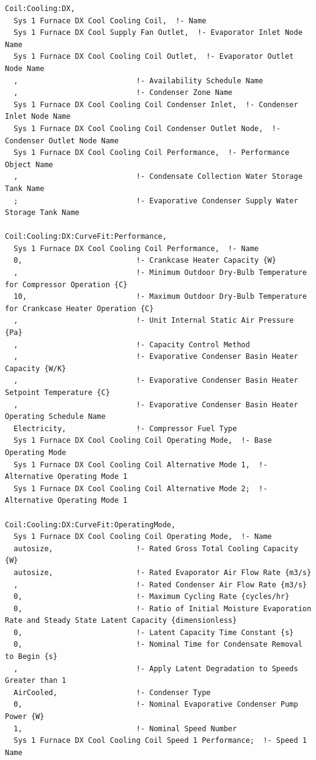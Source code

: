 \begin{lstlisting}
Coil:Cooling:DX,
  Sys 1 Furnace DX Cool Cooling Coil,  !- Name
  Sys 1 Furnace DX Cool Supply Fan Outlet,  !- Evaporator Inlet Node Name
  Sys 1 Furnace DX Cool Cooling Coil Outlet,  !- Evaporator Outlet Node Name
  ,                           !- Availability Schedule Name
  ,                           !- Condenser Zone Name
  Sys 1 Furnace DX Cool Cooling Coil Condenser Inlet,  !- Condenser Inlet Node Name
  Sys 1 Furnace DX Cool Cooling Coil Condenser Outlet Node,  !- Condenser Outlet Node Name
  Sys 1 Furnace DX Cool Cooling Coil Performance,  !- Performance Object Name
  ,                           !- Condensate Collection Water Storage Tank Name
  ;                           !- Evaporative Condenser Supply Water Storage Tank Name

Coil:Cooling:DX:CurveFit:Performance,
  Sys 1 Furnace DX Cool Cooling Coil Performance,  !- Name
  0,                          !- Crankcase Heater Capacity {W}
  ,                           !- Minimum Outdoor Dry-Bulb Temperature for Compressor Operation {C}
  10,                         !- Maximum Outdoor Dry-Bulb Temperature for Crankcase Heater Operation {C}
  ,                           !- Unit Internal Static Air Pressure {Pa}
  ,                           !- Capacity Control Method
  ,                           !- Evaporative Condenser Basin Heater Capacity {W/K}
  ,                           !- Evaporative Condenser Basin Heater Setpoint Temperature {C}
  ,                           !- Evaporative Condenser Basin Heater Operating Schedule Name
  Electricity,                !- Compressor Fuel Type
  Sys 1 Furnace DX Cool Cooling Coil Operating Mode,  !- Base Operating Mode
  Sys 1 Furnace DX Cool Cooling Coil Alternative Mode 1,  !- Alternative Operating Mode 1
  Sys 1 Furnace DX Cool Cooling Coil Alternative Mode 2;  !- Alternative Operating Mode 1

Coil:Cooling:DX:CurveFit:OperatingMode,
  Sys 1 Furnace DX Cool Cooling Coil Operating Mode,  !- Name
  autosize,                   !- Rated Gross Total Cooling Capacity {W}
  autosize,                   !- Rated Evaporator Air Flow Rate {m3/s}
  ,                           !- Rated Condenser Air Flow Rate {m3/s}
  0,                          !- Maximum Cycling Rate {cycles/hr}
  0,                          !- Ratio of Initial Moisture Evaporation Rate and Steady State Latent Capacity {dimensionless}
  0,                          !- Latent Capacity Time Constant {s}
  0,                          !- Nominal Time for Condensate Removal to Begin {s}
  ,                           !- Apply Latent Degradation to Speeds Greater than 1
  AirCooled,                  !- Condenser Type
  0,                          !- Nominal Evaporative Condenser Pump Power {W}
  1,                          !- Nominal Speed Number
  Sys 1 Furnace DX Cool Cooling Coil Speed 1 Performance;  !- Speed 1 Name


\end{lstlisting}
